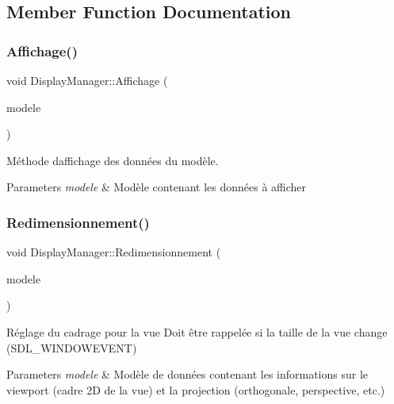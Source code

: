 \subsection{Member Function Documentation}
\mbox{\label{classDisplayManager_ac0243afb77d3ff3d20f7504fc91c66df}} 
\subsubsection{\texorpdfstring{Affichage()}{Affichage()}}
{\footnotesize\ttfamily void Display\+Manager\+::\+Affichage (\begin{DoxyParamCaption}\item[{const \mbox{\hyperlink{classModele}{Modele}} \&}]{modele }\end{DoxyParamCaption})}



Méthode d\textquotesingle{}affichage des données du modèle. 


\begin{DoxyParams}{Parameters}
{\em modele} & Modèle contenant les données à afficher \\
\hline
\end{DoxyParams}
\mbox{\label{classDisplayManager_a6043a48cbb0d711752adbef4797fcb21}} 
\subsubsection{\texorpdfstring{Redimensionnement()}{Redimensionnement()}}
{\footnotesize\ttfamily void Display\+Manager\+::\+Redimensionnement (\begin{DoxyParamCaption}\item[{const \mbox{\hyperlink{classModele}{Modele}} \&}]{modele }\end{DoxyParamCaption})}



Réglage du cadrage pour la vue Doit être rappelée si la taille de la vue change (S\+D\+L\+\_\+\+W\+I\+N\+D\+O\+W\+E\+V\+E\+NT) 


\begin{DoxyParams}{Parameters}
{\em modele} & Modèle de données contenant les informations sur le viewport (cadre 2D de la vue) et la projection (orthogonale, perspective, etc.) \\
\hline
\end{DoxyParams}
\mbox{\label{classDisplayManager_aeb02e2085482d02cf042b4ed9266f65d}} 

